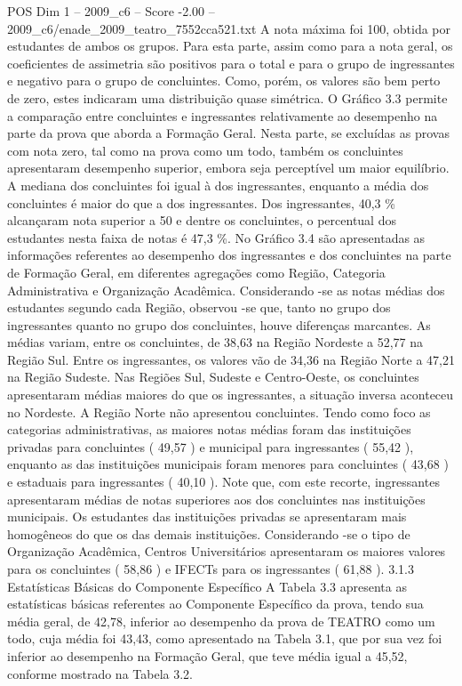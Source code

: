 \begin{textsample}{POS Dim 1 – 2009\_c6 – Score -2.00 – 2009\_c6/enade\_2009\_teatro\_7552cca521.txt}
A nota máxima foi 100, obtida por estudantes de ambos os grupos.
Para esta parte, assim como para a nota geral, os coeficientes de assimetria são positivos para o total e para o grupo de ingressantes e negativo para o grupo de concluintes.
Como, porém, os valores são bem perto de zero, estes indicaram uma distribuição quase simétrica.
O Gráfico 3.3 permite a comparação entre concluintes e ingressantes relativamente ao desempenho na parte da prova que aborda a Formação Geral.
Nesta parte, se excluídas as provas com nota zero, tal como na prova como um todo, também os concluintes apresentaram desempenho superior, embora seja perceptível um maior equilíbrio.
A mediana dos concluintes foi igual à dos ingressantes, enquanto a média dos concluintes é maior do que a dos ingressantes.
Dos ingressantes, 40,3 \% alcançaram nota superior a 50 e dentre os concluintes, o percentual dos estudantes nesta faixa de notas é 47,3 \%.
No Gráfico 3.4 são apresentadas as informações referentes ao desempenho dos ingressantes e dos concluintes na parte de Formação Geral, em diferentes agregações como Região, Categoria Administrativa e Organização Acadêmica.
Considerando -se as notas médias dos estudantes segundo cada Região, observou -se que, tanto no grupo dos ingressantes quanto no grupo dos concluintes, houve diferenças marcantes.
As médias variam, entre os concluintes, de 38,63 na Região Nordeste a 52,77 na Região Sul.
Entre os ingressantes, os valores vão de 34,36 na Região Norte a 47,21 na Região Sudeste.
Nas Regiões Sul, Sudeste e Centro-Oeste, os concluintes apresentaram médias maiores do que os ingressantes, a situação inversa aconteceu no Nordeste.
A Região Norte não apresentou concluintes.
Tendo como foco as categorias administrativas, as maiores notas médias foram das instituições privadas para concluintes ( 49,57 ) e municipal para ingressantes ( 55,42 ), enquanto as das instituições municipais foram menores para concluintes ( 43,68 ) e estaduais para ingressantes ( 40,10 ).
Note que, com este recorte, ingressantes apresentaram médias de notas superiores aos dos concluintes nas instituições municipais.
Os estudantes das instituições privadas se apresentaram mais homogêneos do que os das demais instituições.
Considerando -se o tipo de Organização Acadêmica, Centros Universitários apresentaram os maiores valores para os concluintes ( 58,86 ) e IFECTs para os ingressantes ( 61,88 ). 3.1.3 Estatísticas Básicas do Componente Específico A Tabela 3.3 apresenta as estatísticas básicas referentes ao Componente Específico da prova, tendo sua média geral, de 42,78, inferior ao desempenho da prova de TEATRO como um todo, cuja média foi 43,43, como apresentado na Tabela 3.1, que por sua vez foi inferior ao desempenho na Formação Geral, que teve média igual a 45,52, conforme mostrado na Tabela 3.2.

\end{textsample}
